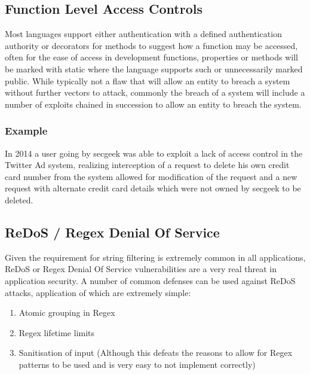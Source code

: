 \documentclass{IEEEtran}
\begin{document}
        \subsection{Function Level Access Controls}
            Most languages support either authentication with a defined authentication authority or decorators 
            for methods to suggest how a function may be accessed, often for the ease of access in development 
            functions, properties or methods will be marked with static where the language supports such or 
            unnecessarily marked public. While typically not a flaw that will allow an entity to breach a system without 
            further vectors to attack, commonly the breach of a system will include a number of exploits chained 
            in succession to allow an entity to breach the system.
            \medskip
            \\
            \subsubsection{Example}
                In 2014 a user going by secgeek\cite{secgeek} was able to exploit a lack of access control in the 
                Twitter Ad system, realizing interception of a request to delete his own credit card number from 
                the system allowed for modification of the request and a new request with alternate credit 
                card details which were not owned by secgeek to be deleted.

        \newpage
        \subsection{ReDoS / Regex Denial Of Service}
            Given the requirement for string filtering is extremely common in all applications,
            ReDoS or Regex Denial Of Service\cite{ReDoS} vulnerabilities are a very real threat in application security.
            A number of common defenses can be used against ReDoS attacks, application of 
            which are extremely simple:
            \begin{enumerate}
                \item Atomic grouping in Regex
                \item Regex lifetime limits
                \item Sanitisation of input (Although this defeats the reasons to allow for
                Regex patterns to be used and is very easy to not implement correctly)
            \end{enumerate}
\end{document}
